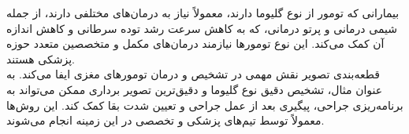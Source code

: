 بیمارانی که تومور از نوع گلیوما دارند، معمولاً نیاز به درمان‌های مختلفی دارند، از جمله شیمی درمانی و پرتو درمانی، که به کاهش سرعت رشد توده سرطانی و کاهش اندازه آن کمک می‌کند. این نوع تومورها نیازمند درمان‌های مکمل و متخصصین متعدد حوزه پزشکی هستند\cite{KOMORI2022126}.
\\
قطعه‌بندی تصویر نقش مهمی در تشخیص و درمان تومورهای مغزی ایفا می‌کند. به عنوان مثال، تشخیص دقیق نوع گلیوما و دقیق‌ترین تصویر برداری ممکن می‌تواند به برنامه‌ریزی جراحی، پیگیری بعد از عمل جراحی و تعیین شدت بقا کمک کند. این روش‌ها معمولاً توسط تیم‌های پزشکی و تخصصی در این زمینه انجام می‌شوند.



